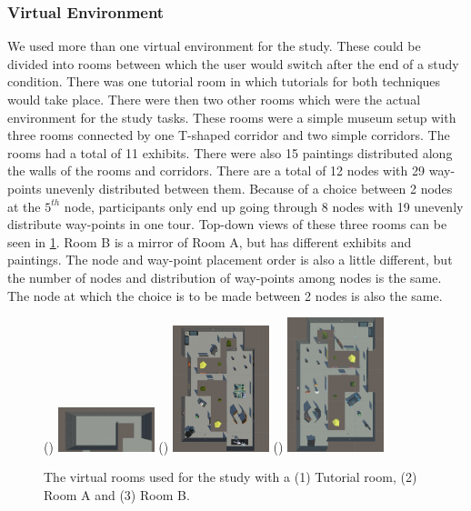 \subsubsection{Virtual Environment}
\label{subsubsection DPUS SP SS: Virtual Environment} 
We used more than one virtual environment for the study. These could be divided into rooms between which the user would switch after the end of a study condition. There was one tutorial room in which tutorials for both techniques would take place. There were then two other rooms which were the actual environment for the study tasks. These rooms were a simple museum setup with three rooms connected by one T-shaped corridor and two simple corridors. The rooms had a total of 11 exhibits. There were also 15 paintings distributed along the walls of the rooms and corridors. There are a total of 12 nodes with 29 way-points unevenly distributed between them. Because of a choice between 2 nodes at the $5^{th}$ node, participants only end up going through 8 nodes with 19 unevenly distribute way-points in one tour. Top-down views of these three rooms can be seen in \cref{fig:study-environment}. Room B is a mirror of Room A, but has different exhibits and paintings. The node and way-point placement order is also a little different, but the number of nodes and distribution of way-points among nodes is the same. The node at which the choice is to be made between 2 nodes is also the same. 

\begin{figure}[]
	()
	\includegraphics[width=0.25\textwidth]{images/tutorial-room.pdf}
	()
	\includegraphics[width=0.25\textwidth]{images/museum-1-objects.pdf}
	()
	\includegraphics[width=0.25\textwidth]{images/museum-2-objects.pdf}
	\caption{The virtual rooms used for the study with a (1) Tutorial room, (2) Room A and (3) Room B.}
	\label{fig:study-environment}
\end{figure}

